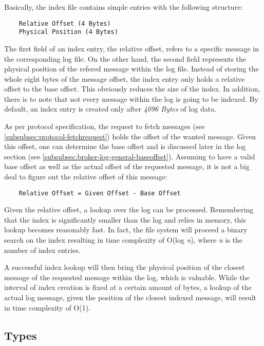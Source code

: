 Basically, the index file contains simple entries with the following
structure:

\begin{verbatim}
    Relative Offset (4 Bytes)
    Physical Position (4 Bytes)
\end{verbatim}

The first field of an index entry, the relative offset, refers to a specific
message in the corresponding log file. On the other hand, the second field
represents the physical position of the refered message within the log file.
Instead of storing the whole eight bytes of the message offset, the index entry
only holds a relative offset to the base offset. This obviously reduces the size
of the index. In addition, there is to note that not every message within the
log is going to be indexed. By default, an index entry is created only after
\textit{4096 Bytes} of log data.

As per protocol specification, the request to fetch messages (see
\ref{subsubsec:protocol-fetchrequest}) holds the offset of the wanted message.
Given this offset, one can determine the base offset and is discussed later in
the log section (see \ref{subsubsec:broker-log-general-baseoffset}).  Assuming
to have a valid base offset as well as the actual offset of the requested
message, it is not a big deal to figure out the relative offset of this message:

\begin{verbatim}
    Relative Offset = Given Offset - Base Offset
\end{verbatim}

Given the relative offset, a lookup over the log can be processed. Remembering
that the index is significantly smaller than the log and relies in memory, this
lookup becomes reasonably fast. In fact, the file system will proceed a binary
search on the index resulting in time complexity of O(log \textit{n}), where
\textit{n} is the number of index entries.

A successful index lookup will then bring the physical position of the closest
message of the requested message within the log, which is valuable. While the
interval of index creation is fixed at a certain amount of bytes, a lookup of
the actual log message, given the position of the closest indexed message, will
result in time complexity of O(1).

\subsection{Types}


